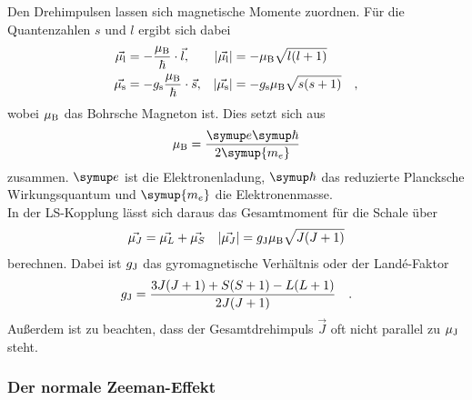 \noindent
Den Drehimpulsen lassen sich magnetische Momente zuordnen. Für die Quantenzahlen $s$ und $l$ ergibt sich dabei 
\begin{align*}
    \vec{\mu_{\text{l}}} &= - \frac{\mu_\text{B}}{\hbar} \cdot \vec{l}, & |\vec{\mu_{\text{l}}}|& = - \mu_\text{B} \sqrt{l(l+1)}\\
    \vec{\mu_{\text{s}}} &= - g_{\text{s}} \frac{\mu_\text{B}}{\hbar} \cdot \vec{s}, & |\vec{\mu_{\text{s}}}| &= - g_{\text{s}} \mu_\text{B} \sqrt{s(s+1)} \quad ,
\end{align*}
wobei $\mu_{\text{B}}$ das Bohrsche Magneton ist.
Dies setzt sich aus 
\begin{equation*}
    \mu_\t{B} = \frac{\symup e \symup \hbar}{2\symup{m_e}}
\end{equation*}
zusammen. $\symup e$  ist die Elektronenladung\cite{e0}, $\symup \hbar$ das reduzierte Plancksche Wirkungsquantum\cite{Planck} und $\symup{m_e}$ die Elektronenmasse\cite{m0}.\\
In der LS-Kopplung lässt sich daraus das Gesamtmoment für die Schale über
\begin{align}
    \vec{\mu_J} &= \vec{\mu_L} + \vec{\mu_S} & |\vec{\mu_J}| = g_{\text{J}} \mu_\text{B} \sqrt{J(J+1)} 
\end{align}
berechnen. Dabei ist $g_{\text{J}} $ das gyromagnetische Verhältnis oder der Landé-Faktor 
\begin{equation}
    g_{\text{J}} = \frac{3J(J+1) + S(S+1) - L(L+1)}{2J(J+1)} \quad .
    \label{eqn:lande}
\end{equation}
Außerdem ist zu beachten, dass der Gesamtdrehimpuls $ \vec J$ oft nicht parallel zu $\mu_{\text{J}}$ steht.

\subsubsection{Der normale Zeeman-Effekt}

